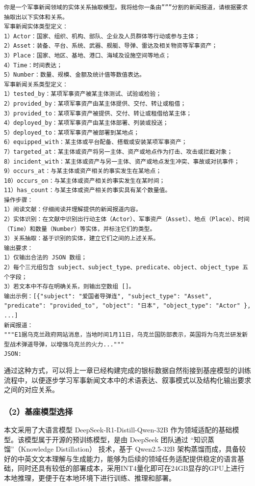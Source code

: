 \begin{lstlisting}[style=promptbox]
你是一个军事新闻领域的实体关系抽取模型。我将给你一条由”””分割的新闻报道，请根据要求抽取出以下实体和关系。
军事新闻实体类型定义：
1）Actor：国家、组织、机构、部队、企业及人员群体等行动或参与主体；
2）Asset：装备、平台、系统、武器、舰艇、导弹、雷达及相关物资等军事资产；
3）Place：国家、地区、基地、港口、海域及设施空间等地点；
4）Time：时间表达；
5）Number：数量、规模、金额及统计值等数值表达。
军事新闻关系类型定义：
1）tested_by：某项军事资产被某主体测试、试验或检验；
2）provided_by：某项军事资产由某主体提供、交付、转让或租借；
3）provided_to：某项军事资产被提供、交付、转让或租借给某主体；
4）deployed_by：某项军事资产由某主体部署、列装或投送；
5）deployed_to：某项军事资产被部署到某地点；
6）equipped_with：某主体或平台配备、搭载或安装某项军事资产；
7）targeted_at：某主体或资产将另一主体、资产或地点作为打击、攻击或拦截对象；
8）incident_with：某主体或资产与另一主体、资产或地点发生冲突、事故或对抗事件；
9）occurs_at：与某主体或资产相关的事实发生在某地点；
10）occurs_on：与某主体或资产相关的事实发生在某时间；
11）has_count：与某主体或资产相关的事实具有某个数量值。
操作步骤：
1）阅读文献：仔细阅读并理解提供的新闻报道内容。
2）实体识别：在文献中识别出行动主体（Actor）、军事资产（Asset）、地点（Place）、时间（Time）和数量（Number）等实体，并标注它们的类型。
3）关系抽取：基于识别的实体，建立它们之间的上述关系。
输出要求：
1）仅输出合法的 JSON 数组；
2）每个三元组包含 subject、subject_type、predicate、object、object_type 五个字段；
3）若文本中不存在明确关系，则输出空数组 []。
输出示例：[{"subject": "爱国者导弹连", "subject_type": "Asset", "predicate": "provided_to", "object": "日本", "object_type": "Actor" }, ...]
新闻报道：
"""E1据乌克兰政府网站消息，当地时间1月11日，乌克兰国防部表示，英国将为乌克兰研发新型战术弹道导弹，以增强乌克兰的火力..."""
JSON:
\end{lstlisting}

通过这种方式，可以将上一章已经构建完成的银标数据自然衔接到基座模型的训练流程中，以便逐步学习军事新闻文本中的术语表达、叙事模式以及结构化输出要求之间的对应关系。

\subsubsection*{（2）基座模型选择}

本文采用了大语言模型 DeepSeek-R1-Distill-Qwen-32B 作为领域适配的基础模型。该模型属于开源的预训练模型，是由 DeepSeek 团队通过 “知识蒸馏”（Knowledge Distillation） 技术，基于 Qwen2.5-32B 架构蒸馏而成\cite{Guo2025DeepSeekR1,Yang2024Qwen25}，具备较好的中英文文本理解与生成能力，能够为后续的领域任务适配提供稳定的语言基础，同时还具有较低的部署成本，采用INT4量化即可在24GB显存的GPU上进行本地推理，更便于在本地环境下进行训练、推理和部署。

